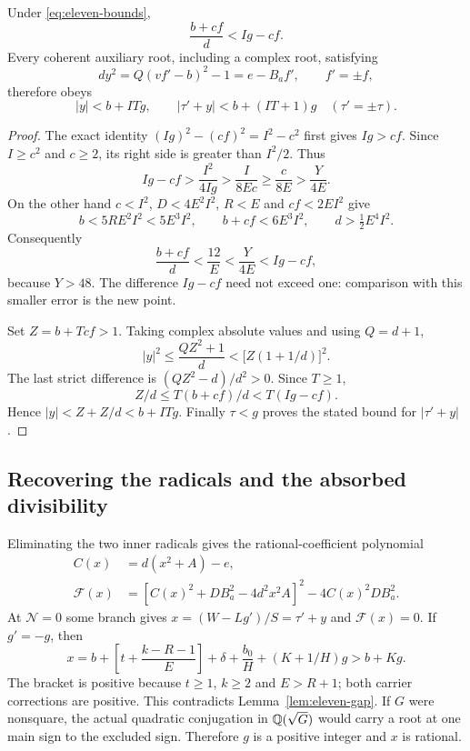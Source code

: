 \begin{lemma}\label{lem:eleven-gap}
Under \eqref{eq:eleven-bounds},
\[
 \frac{b+cf}{d}<Ig-cf.
\]
Every coherent auxiliary root, including a complex root, satisfying
\[
 d y^2=Q(vf'-b)^2-1=e-B_af',\qquad f'=\pm f,
\]
therefore obeys
\[
 |y|<b+ITg,\qquad |\tau'+y|<b+(IT+1)g
 \quad(\tau'=\pm\tau).
\]
\end{lemma}

\begin{proof}
The exact identity $(Ig)^2-(cf)^2=I^2-c^2$ first gives $Ig>cf$.
Since $I\ge c^2$ and $c\ge2$, its right side is greater than
$I^2/2$. Thus
\[
 Ig-cf>\frac{I^2}{4Ig}>\frac{I}{8Ec}
       \ge\frac{c}{8E}>\frac{Y}{4E}.
\]
On the other hand $c<I^2$, $D<4E^2I^2$, $R<E$ and $cf<2EI^2$
give
\[
 b<5RE^2I^2<5E^3I^2,\qquad
 b+cf<6E^3I^2,\qquad d>\tfrac12E^4I^2.
\]
Consequently
\[
 \frac{b+cf}{d}<\frac{12}{E}<\frac{Y}{4E}<Ig-cf,
\]
because $Y>48$. The difference $Ig-cf$ need not exceed one: comparison
with this smaller error is the new point.

Set $Z=b+Tcf>1$. Taking complex absolute values and using $Q=d+1$,
\[
 |y|^2\le\frac{QZ^2+1}{d}
 <\bigl[Z(1+1/d)\bigr]^2.
\]
The last strict difference is $(QZ^2-d)/d^2>0$. Since $T\ge1$,
\[
 Z/d\le T(b+cf)/d<T(Ig-cf).
\]
Hence $|y|<Z+Z/d<b+ITg$. Finally $\tau<g$ proves the stated
bound for $|\tau'+y|$.
\end{proof}

\subsection{Recovering the radicals and the absorbed divisibility}

Eliminating the two inner radicals gives the rational-coefficient
polynomial
\begin{align*}
 C(x)&=d(x^2+A)-e,\\
 \mathcal F(x)&=[C(x)^2+DB_a^2-4d^2x^2A]^2-4C(x)^2DB_a^2.
\end{align*}
At $\mathcal N=0$ some branch gives
$x=(W-Lg')/S=\tau'+y$ and $\mathcal F(x)=0$. If $g'=-g$, then
\[
 x=b+\left[t+\frac{k-R-1}{E}\right]
      +\delta+\frac{b_0}{H}+(K+1/H)g>b+Kg.
\]
The bracket is positive because $t\ge1$, $k\ge2$ and $E>R+1$;
both carrier corrections are positive. This contradicts
Lemma~\ref{lem:eleven-gap}. If $G$ were nonsquare, the actual quadratic
conjugation in $\mathbb Q(\sqrt G)$ would carry a root at one main sign to
the excluded sign. Therefore $g$ is a positive integer and $x$ is
rational.

